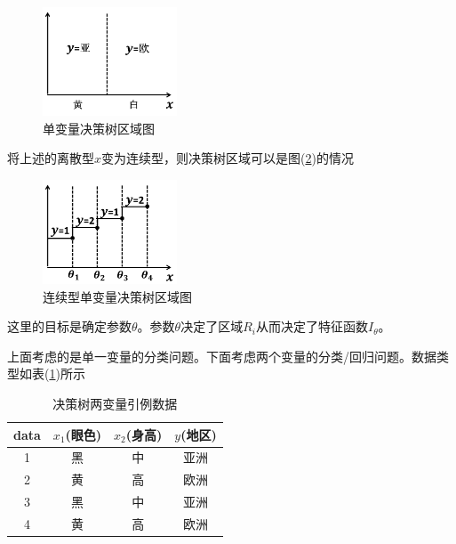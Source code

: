                 \begin{figure}[H]
                \centering
                \includegraphics[width=4cm]{images/Univariate_tree_area.jpg}
                \caption{单变量决策树区域图}
                \label{fig:单变量决策树区域图}
                \end{figure}
        \par
        将上述的离散型$x$变为连续型，则决策树区域可以是图(\ref{fig:连续型单变量决策树区域图})的情况
                \begin{figure}[H]
                \centering
                \includegraphics[width=4cm]{images/continuous_univariate_tree_area.jpg}
                \caption{连续型单变量决策树区域图}
                \label{fig:连续型单变量决策树区域图}
                \end{figure}
        \noindent 这里的目标是确定参数$\theta$。参数$\theta$决定了区域$R_i$从而决定了特征函数$I_\theta$。
        \par
        上面考虑的是单一变量的分类问题。下面考虑两个变量的分类/回归问题。数据类型如表(\ref{决策树两变量引例数据})所示
        \begin{table}[H]
          \caption{决策树两变量引例数据}
          \label{决策树两变量引例数据}
          \centering
          \begin{tabular}{c|ccc}
          \toprule
          data   & $x_1$(眼色)    & $x_2$(身高)    & $y$(地区) \\
          \midrule
          1      & 黑      & 中      & 亚洲 \\
          2      & 黄      & 高      & 欧洲 \\
          3      & 黑      & 中      & 亚洲 \\
          4      & 黄      & 高      & 欧洲 \\
          \bottomrule
          \end{tabular}
        \end{table}
